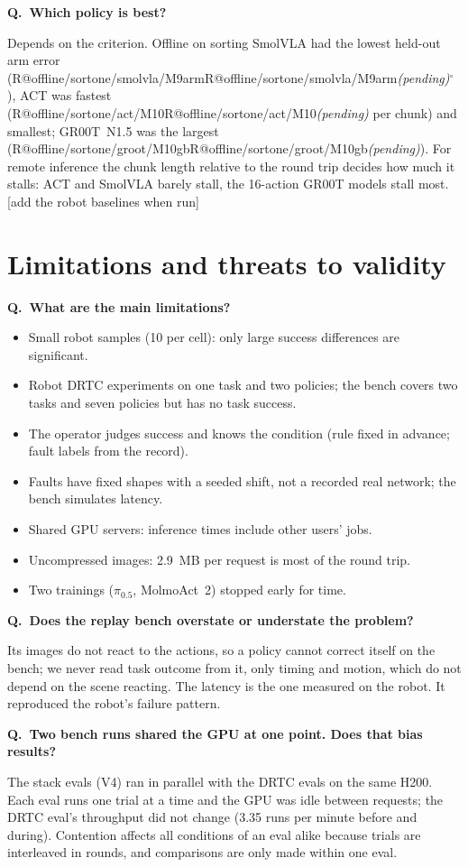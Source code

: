 \documentclass[11pt,a4paper]{article}
\makeatletter
\newcommand{\R}[1]{\ifcsname R@#1\endcsname\csname R@#1\endcsname\else\pending\fi}
\newcommand{\pending}{\textit{\color{warn}(pending)}}
\newcommand{\drtc}{DRTC}
\newcommand{\smolvla}{SmolVLA}
\newcommand{\groot}{GR00T~N1.5}
\newcommand{\pizerofive}{$\pi_{0.5}$}
\newcommand{\degree}{$^\circ$}
\newcounter{qn}
\newcommand{\q}[2]{\stepcounter{qn}\par\medskip
  {\bfseries\color{accent}Q\theqn.\ #1}\par\nopagebreak[4]#2\par}
\newcommand{\todo}[1]{{\color{warn}[#1]}}
\makeatother
\begin{document}
\q{Which policy is best?}{Depends on the criterion. Offline on sorting \smolvla{} had the lowest held-out arm error
(\R{offline/sortone/smolvla/M9arm}\degree), ACT was fastest (\R{offline/sortone/act/M10} per chunk) and smallest;
\groot{} was the largest (\R{offline/sortone/groot/M10gb}). For remote inference the chunk length relative to the
round trip decides how much it stalls: ACT and \smolvla{} barely stall, the 16-action GR00T models stall most.
\todo{add the robot baselines when run}}

\section{Limitations and threats to validity}

\q{What are the main limitations?}{\begin{itemize}[nosep]
\item Small robot samples (10 per cell): only large success differences are significant.
\item Robot \drtc{} experiments on one task and two policies; the bench covers two tasks and seven policies but has no
  task success.
\item The operator judges success and knows the condition (rule fixed in advance; fault labels from the record).
\item Faults have fixed shapes with a seeded shift, not a recorded real network; the bench simulates latency.
\item Shared GPU servers: inference times include other users' jobs.
\item Uncompressed images: 2.9~MB per request is most of the round trip.
\item Two trainings (\pizerofive, MolmoAct~2) stopped early for time.
\end{itemize}}

\q{Does the replay bench overstate or understate the problem?}{Its images do not react to the actions, so a policy
cannot correct itself on the bench; we never read task outcome from it, only timing and motion, which do not depend on
the scene reacting. The latency is the one measured on the robot. It reproduced the robot's failure pattern.}

\q{Two bench runs shared the GPU at one point. Does that bias results?}{The stack evals (V4) ran in parallel with the
\drtc{} evals on the same H200. Each eval runs one trial at a time and the GPU was idle between requests; the \drtc{}
eval's throughput did not change (3.35 runs per minute before and during). Contention affects all conditions of an
eval alike because trials are interleaved in rounds, and comparisons are only made within one eval.}
\end{document}
